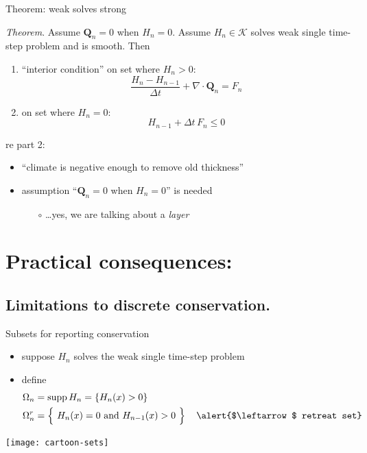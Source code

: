 \documentclass{beamer}
\newcommand\bQ{\mathbf{Q}}
\newcommand{\Div}{\nabla\cdot}
\begin{document}
\begin{frame}{Theorem: weak solves strong}

\emph{Theorem}.  Assume $\bQ_n=0$ when $H_n=0$.  Assume $H_n \in \mathcal{K}$ solves weak single time-step problem and is smooth.  Then
  \begin{enumerate}
  \item ``interior condition'' on set where $H_n>0$:
    $$\frac{H_n - H_{n-1}}{\Delta t} + \Div \bQ_n = F_n$$
  \item on set where $H_n = 0$:
    $$H_{n-1} + \Delta t\, F_n \le 0$$
  \end{enumerate}

\bigskip
re part 2:
  \begin{itemize}
  \item ``climate is negative enough to remove old thickness''
  \item assumption ``$\bQ_n=0$ when $H_n=0$'' is needed
    \begin{itemize}
    \item[$\circ$] \dots yes, we are talking about a \emph{layer}
    \end{itemize}
  \end{itemize}
\end{frame}


\section{Practical consequences:}

\subsection{Limitations to discrete conservation.}

\begin{frame}{Subsets for reporting conservation}
\begin{itemize}
\item suppose $H_n$ solves the weak single time-step problem
\item define
	\begin{align*}
	\Omega_n &= \operatorname{supp} H_n = \left\{H_n(x) > 0\right\} \\
	\Omega_n^r &= \left\{\phantom{\Big|}H_n(x)= 0 \text{ and } H_{n-1}(x) > 0\phantom{\Big|}\right\} \quad \text{\alert{$\leftarrow$ retreat set}}
	\end{align*}
\end{itemize}

\vspace{-2mm}
\begin{center}
\texttt{[image: cartoon-sets]}
\end{center}
\end{frame}
\end{document}
